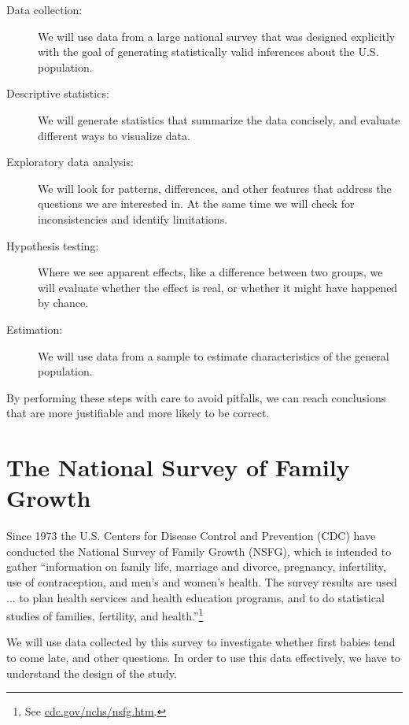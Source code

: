 \documentclass[12pt]{book}
\begin{document}
\begin{description}

\item[Data collection:] We will use data from a large national survey
  that was designed explicitly with the goal of generating
  statistically valid inferences about the U.S. population.

\item[Descriptive statistics:] We will generate statistics that
  summarize the data concisely, and evaluate different ways to
  visualize data.

\item[Exploratory data analysis:] We will look for
  patterns, differences, and other features that address the questions
  we are interested in.  At the same time we will check for
  inconsistencies and identify limitations.

\item[Hypothesis testing:] Where we see apparent effects, like a
  difference between two groups, we will evaluate whether the effect
  is real, or whether it might have happened by chance.

\item[Estimation:] We will use data from a sample to estimate
  characteristics of the general population.

\end{description}

By performing these steps with care to avoid pitfalls, we can
reach conclusions that are more justifiable and more likely to be
correct.


\section{The National Survey of Family Growth}
\label{nsfg}

Since 1973 the U.S. Centers for Disease Control and Prevention (CDC)
have conducted the National Survey of Family Growth (NSFG),
which is intended to gather ``information on family life, marriage and
divorce, pregnancy, infertility, use of contraception, and men's and
women's health. The survey results are used ... to plan health services and
health education programs, and to do statistical studies of families,
fertility, and health.''\footnote{See
  \url{cdc.gov/nchs/nsfg.htm}.}

We will use data collected by this survey to investigate whether first
babies tend to come late, and other questions.  In order to use this
data effectively, we have to understand the design of the study.
\end{document}
